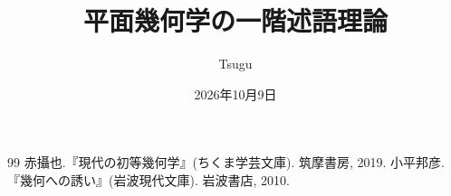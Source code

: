 \documentclass[dvipdfmx,12pt]{jbook}
\title{平面幾何学の一階述語理論}
\date{2026年10月9日}
\author{Tsugu}
\theoremstyle{definition}
\theoremstyle{definition}
\begin{document}
  \maketitle
  
  \tableofcontents
  \setcounter{page}{1}
  
  
  
  \begin{thebibliography}{99}
     赤攝也.『現代の初等幾何学』(ちくま学芸文庫). 筑摩書房, 2019.
     小平邦彦.『幾何への誘い』(岩波現代文庫). 岩波書店, 2010.
  \end{thebibliography}
  \clearpage
  \printindex
\end{document}
